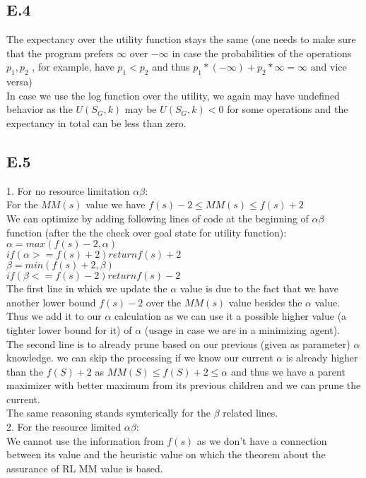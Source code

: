 \documentclass[12pt]{article}
\begin{document}
\subsection*{E.4}

The expectancy over the utility function stays the same (one needs to make sure that the program prefers $\infty$ over $-\infty$ in case the probabilities of the operations $p_1,p_2$ , for example, have $p_1<p_2$ and thus $p_1*(-\infty) + p_2*\infty = \infty$ and vice versa)\\
In case we use the log function over the utility, we again may have undefined behavior as the $U(S_G,k)$ may be $U(S_G,k)<0$ for some operations and the expectancy in total can be less than zero.

\subsection*{E.5}

1. For no resource limitation $\alpha\beta$:\\
For the $MM(s)$ value we have $f(s)-2 \leq MM(s) \leq f(s)+2$\\
We can optimize by adding following lines of code at the beginning of $\alpha\beta$ function (after the the check over goal state for utility function):\\
$\alpha = max(f(s)-2,\alpha)$\\
$if (\alpha >= f(s)+2) return f(s)+2$\\
$\beta = min(f(s)+2,\beta)$\\
$if (\beta <= f(s)-2) return f(s)-2$\\

The first line in which we update the $\alpha$ value is due to the fact that we have another lower bound $f(s)-2$ over the $MM(s)$ value besides the $\alpha$ value.\\
Thus we add it to our $\alpha$ calculation as we can use it a possible higher value (a tighter lower bound for it) of $\alpha$ (usage in case we are in a minimizing agent).\\

The second line is to already prune based on our previous (given as parameter) $\alpha$ knowledge. we can skip the processing if we know our current $\alpha$ is already higher than the $f(S)+2$ as $MM(S) \leq f(S) + 2 \leq \alpha$  and thus we have a parent maximizer with better maximum from its previous children and we can prune the current.\\
The same reasoning stands symterically for the $\beta$ related lines.\\

2. For the resource limited $\alpha\beta$:\\
We cannot use the information from $f(s)$ as we don't have a connection between its value and the heuristic value on which the theorem about the assurance of RL MM value is based.
\end{document}
